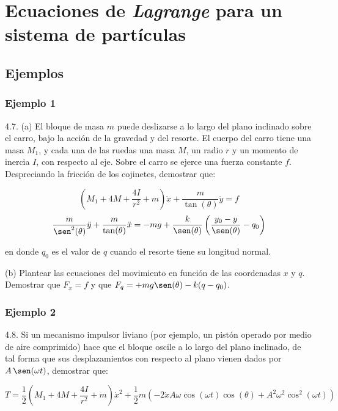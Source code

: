 \chapter{Ecuaciones de \emph{Lagrange} para un sistema de partículas}

\section{Ejemplos}

\subsection{Ejemplo 1}
4.7. (a) El bloque de masa $m$ puede deslizarse a lo largo del plano inclinado
sobre el carro, bajo la acción de la gravedad y del resorte. El cuerpo del carro
tiene una masa $M_1$, y cada una de las ruedas una masa $M$, un radio $r$ y un
momento de inercia $I$, con respecto al eje. Sobre el carro se ejerce una fuerza
constante $f$. Despreciando la fricción de los cojinetes, demostrar que:

\begin{equation*}
    \left(M_1+4M+\frac{4I}{r^2}+m\right)\ddot{x}+
    \frac{m}{\tan(\theta)}\ddot{y}=f
\end{equation*}
\begin{equation*}
    \frac{m}{\sen^2(\theta)}\ddot{y}+
    \frac{m}{\tan(\theta)}\ddot{x}=
    -mg+
    \frac{k}{\sen(\theta)}\left(\frac{y_0-y}{\sen(\theta)}-q_0\right)
\end{equation*}

en donde $q_0$ es el valor de $q$ cuando el resorte tiene su longitud normal.

(b) Plantear las ecuaciones del movimiento en función de las coordenadas $x$ y
$q$. Demostrar que $F_x=f$ y que $F_q=+mg\sen(\theta)-k(q-q_0)$.

\subsection{Ejemplo 2}
4.8. Si un mecanismo impulsor liviano (por ejemplo, un pistón operado por medio
de aire comprimido) hace que el bloque oscile a lo largo del plano inclinado, de
tal forma que sus desplazamientos con respecto al plano vienen dados por
$A\,\sen(\omega t)$, demostrar que:

\begin{equation*}
    T=\frac{1}{2}\left(M_1+4M+\frac{4I}{r^2}+m\right)\dot{x}^2+
    \frac{1}{2}m(
        -2\dot{x}A\omega\cos(\omega t)\cos(\theta)+
        A^2\omega^2 \cos^2(\omega t)
    )
\end{equation*}

